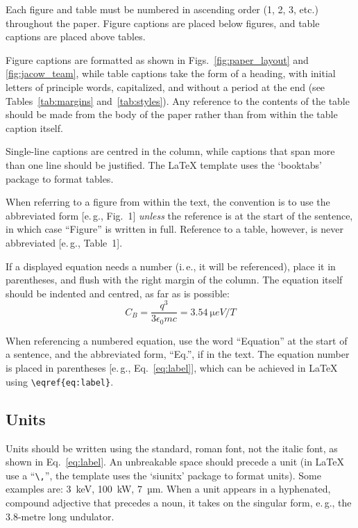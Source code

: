 \documentclass[a4paper,
               nospread,     %
               ]{jacow}
\begin{document}
Each figure and table must be numbered in ascending
order (1, 2, 3, etc.) throughout the paper. 
Figure captions are placed below figures, and table
captions are placed above tables.

Figure captions are formatted as shown in Figs.~\ref{fig:paper_layout} and \ref{fig:jacow_team},
while table captions take the form of a heading,
with initial letters of principle words, capitalized, and
without a period at the end (see Tables~\ref{tab:margins} and~\ref{tab:styles}).
Any reference to the contents of the table should be made from
the body of the paper rather than from within the table
caption itself.

Single-line captions are centred in the column, while captions
that span more than one line should be justified.
The \LaTeX{} template uses the ‘booktabs’ package to
format tables. 

When referring to a figure from within the text, the
convention is to use the abbreviated form [e.\,g., Fig.~1]
\emph{unless} the reference is at the start of the sentence, in
which case “Figure” is written in full. Reference to a
table, however, is never abbreviated [e.\,g., Table~1].


If a displayed equation needs a number (i.\,e., it will be
referenced), place it in parentheses, and flush with the
right margin of the column. The equation itself should be
indented and centred, as far as is possible:
\begin{equation}\label{eq:label}
    C_B=\frac{q^3}{3\epsilon_{0} mc}=\SI{3.54}{\micro eV/T}
\end{equation}

When referencing a numbered equation, use the word
“Equation” at the start of a sentence, and the abbreviated
form, “Eq.”, if in the text. The equation number is placed
in parentheses [e.\,g., Eq.~\eqref{eq:label}], which can be 
achieved in \LaTeX{} using \verb|\eqref{eq:label}|.

\subsection{Units}
	
Units should be written using the standard, roman font,
not the italic font, as shown in Eq.~\eqref{eq:label}.
An unbreakable space should precede a unit (in \LaTeX{} use a “\verb|\,|”,
the template uses the ‘siunitx’ package to format units).
Some examples are: \SI{3}{keV},
\SI{100}{kW}, \SI{7}{µm}. When a unit appears in a hyphenated,
compound adjective that precedes a noun, it takes on the
singular form, e.\,g., the 3.8-metre long undulator.
\end{document}
